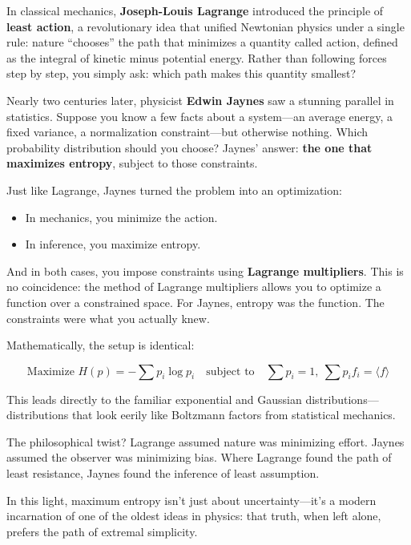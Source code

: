 \begin{tcolorbox}[title={\textbf{Historical Sidebar: Lagrange, Jaynes, and the Least Action of Knowledge}}, colback=gray!5, colframe=black, fonttitle=\bfseries]

  In classical mechanics, \textbf{Joseph-Louis Lagrange} introduced the principle of \textbf{least action}, a revolutionary idea that unified Newtonian physics under a single rule: nature “chooses” the path that minimizes a quantity called action, defined as the integral of kinetic minus potential energy. Rather than following forces step by step, you simply ask: which path makes this quantity smallest?

  \medskip

  Nearly two centuries later, physicist \textbf{Edwin Jaynes} saw a stunning parallel in statistics. Suppose you know a few facts about a system—an average energy, a fixed variance, a normalization constraint—but otherwise nothing. Which probability distribution should you choose?  Jaynes’ answer: \textbf{the one that maximizes entropy}, subject to those constraints.

  \medskip

  Just like Lagrange, Jaynes turned the problem into an optimization:

  \medskip

  \begin{itemize}
    \item In mechanics, you minimize the action.
    \item In inference, you maximize entropy.
  \end{itemize}

  \medskip

  And in both cases, you impose constraints using \textbf{Lagrange multipliers}. This is no coincidence: the method of Lagrange multipliers allows you to optimize a function over a constrained space. For Jaynes, entropy was the function. The constraints were what you actually knew.

  \medskip

  Mathematically, the setup is identical:

  \[
  \text{Maximize } H(p) = -\sum p_i \log p_i \quad \text{subject to} \quad \sum p_i = 1,\ \sum p_i f_i = \langle f \rangle
  \]

  This leads directly to the familiar exponential and Gaussian distributions—distributions that look eerily like Boltzmann factors from statistical mechanics.

  \medskip

  The philosophical twist?  Lagrange assumed nature was minimizing effort.  Jaynes assumed the observer was minimizing bias.  Where Lagrange found the path of least resistance, Jaynes found the inference of least assumption.

  \medskip

  In this light, maximum entropy isn’t just about uncertainty—it’s a modern incarnation of one of the oldest ideas in physics: that truth, when left alone, prefers the path of extremal simplicity.

\end{tcolorbox}
